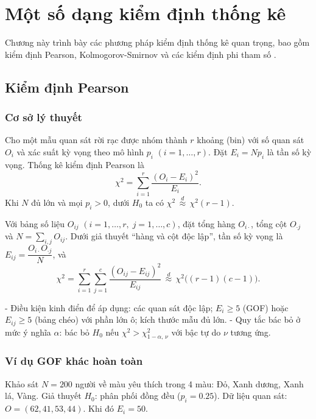 \chapter{Một số dạng kiểm định thống kê}
Chương này trình bày các phương pháp kiểm định thống kê quan trọng, bao gồm kiểm định Pearson, Kolmogorov-Smirnov và các kiểm định phi tham số \cite{lehmann2005, conover1999, sheskin2011}.

\section{Kiểm định Pearson}

\subsection{Cơ sở lý thuyết}
\begin{dn}
Cho một mẫu quan sát rời rạc được nhóm thành $r$ khoảng (bin) với số quan sát $O_i$ và xác suất kỳ vọng theo mô hình $p_i$ $(i=1,\ldots,r)$. Đặt $E_i=Np_i$ là tần số kỳ vọng. Thống kê kiểm định Pearson là
\[
\chi^2=\sum_{i=1}^{r}\frac{(O_i-E_i)^2}{E_i}.
\]
Khi $N$ đủ lớn và mọi $p_i>0$, dưới $H_0$ ta có $\chi^2\,\overset{d}{\approx}\,\chi^2(r-1)$.
\end{dn}

\begin{dn}
Với bảng số liệu $O_{ij}$ $(i=1,\ldots,r,\; j=1,\ldots,c)$, đặt tổng hàng $O_{i\cdot}$, tổng cột $O_{\cdot j}$ và $N=\sum_{i,j}O_{ij}$. Dưới giả thuyết “hàng và cột độc lập”, tần số kỳ vọng là $E_{ij}=\dfrac{O_{i\cdot}O_{\cdot j}}{N}$, và
\[\chi^2=\sum_{i=1}^{r}\sum_{j=1}^{c}\frac{(O_{ij}-E_{ij})^2}{E_{ij}}\,\overset{d}{\approx}\,\chi^2\big((r-1)(c-1)\big).
\]
\end{dn}

\begin{tinhchat}
- Điều kiện kinh điển để áp dụng: các quan sát độc lập; $E_i\ge5$ (GOF) hoặc $E_{ij}\ge5$ (bảng chéo) với phần lớn ô; kích thước mẫu đủ lớn.
- Quy tắc bác bỏ ở mức ý nghĩa $\alpha$: bác bỏ $H_0$ nếu $\chi^2>\chi^2_{1-\alpha,\,\nu}$ với bậc tự do $\nu$ tương ứng.
\end{tinhchat}

\subsection{Ví dụ GOF khác hoàn toàn}
Khảo sát $N=200$ người về màu yêu thích trong 4 màu: Đỏ, Xanh dương, Xanh lá, Vàng. Giả thuyết $H_0$: phân phối đồng đều ($p_i=0.25$). Dữ liệu quan sát: $O=(62,41,53,44)$. Khi đó $E_i=50$.

